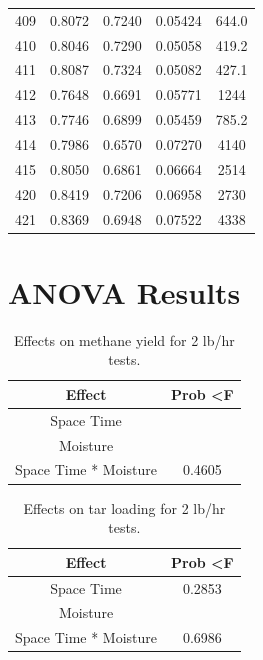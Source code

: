 \documentclass[11pt,twocolumn]{article}
\begin{document}
\begin{center}
\begin{tabular}{ccccc}
409    &     0.8072 &      0.7240 &        0.05424 &            644.0 \\
410    &     0.8046 &      0.7290 &        0.05058 &            419.2 \\
411    &     0.8087 &      0.7324 &        0.05082 &            427.1 \\
412    &     0.7648 &      0.6691 &        0.05771 &             1244 \\
413    &     0.7746 &      0.6899 &        0.05459 &            785.2 \\
414    &     0.7986 &      0.6570 &        0.07270 &             4140 \\
415    &     0.8050 &      0.6861 &        0.06664 &             2514 \\
420    &     0.8419 &      0.7206 &        0.06958 &             2730 \\
421    &     0.8369 &      0.6948 &        0.07522 &             4338 \\
\bottomrule
\end{tabular}
\end{center}

\newpage
\section{ANOVA Results}
\label{app_anova}

\begin{table}[H]
	\centering
	\caption{Effects on methane yield for 2 lb/hr tests.}
	\label{tar2}
	\begin{tabular}{c c}
	Effect				&	Prob \textless F	\\
	\hline
	Space Time			&	\color{red}{\textless 0.0001} \\
	Moisture				&	\color{red}{0.0001} \\
	Space Time * Moisture	&	0.4605 \\
	\end{tabular}
\end{table}

\begin{table}
	\centering
	\caption{Effects on tar loading for 2 lb/hr tests.}
	\label{tar2}
	\begin{tabular}{c c}
	Effect				&	Prob \textless F	\\
	\hline
	Space Time			&	0.2853 \\
	Moisture				&	\color{red}{0.0280} \\
	Space Time * Moisture	&	0.6986 \\
	\end{tabular}
\end{table}
\end{document}
